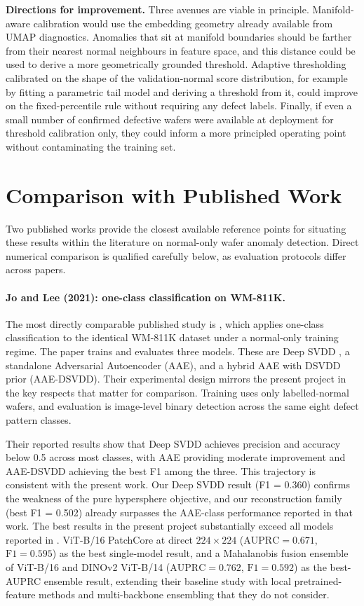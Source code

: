 \documentclass[11pt]{article}
\begin{document}
\textbf{Directions for improvement.} Three avenues are viable in principle. Manifold-aware calibration would use the embedding geometry already available from UMAP diagnostics. Anomalies that sit at manifold boundaries should be farther from their nearest normal neighbours in feature space, and this distance could be used to derive a more geometrically grounded threshold. Adaptive thresholding calibrated on the shape of the validation-normal score distribution, for example by fitting a parametric tail model and deriving a threshold from it, could improve on the fixed-percentile rule without requiring any defect labels. Finally, if even a small number of confirmed defective wafers were available at deployment for threshold calibration only, they could inform a more principled operating point without contaminating the training set.

\section{Comparison with Published Work}

Two published works provide the closest available reference points for
situating these results within the literature on normal-only wafer anomaly
detection. Direct numerical comparison is qualified carefully below, as
evaluation protocols differ across papers.

\paragraph{Jo and Lee (2021): one-class classification on WM-811K.}
The most directly comparable published study is \cite{jo2021oneclass},
which applies one-class classification to the identical WM-811K dataset
under a normal-only training regime. The paper trains and evaluates three
models. These are Deep SVDD \cite{ruff2018deepsvdd}, a standalone Adversarial
Autoencoder (AAE), and a hybrid AAE with DSVDD prior (AAE-DSVDD). Their
experimental design mirrors the present project in the key respects that
matter for comparison. Training uses only labelled-normal wafers, and
evaluation is image-level binary detection across the same eight defect
pattern classes.

Their reported results show that Deep SVDD achieves precision and accuracy
below 0.5 across most classes, with AAE providing moderate improvement and
AAE-DSVDD achieving the best F1 among the three. This trajectory is
consistent with the present work. Our Deep SVDD result (F1 = 0.360)
confirms the weakness of the pure hypersphere objective, and our
reconstruction family (best F1 = 0.502) already surpasses the AAE-class
performance reported in that work. The best results in the present project substantially exceed all models reported in
\cite{jo2021oneclass}. ViT-B/16 PatchCore at direct $224\!\times\!224$ ($\mathrm{AUPRC}=0.671$, $\mathrm{F1}=0.595$)
as the best single-model result, and a Mahalanobis fusion ensemble of ViT-B/16
and DINOv2 ViT-B/14 ($\mathrm{AUPRC}=0.762$, $\mathrm{F1}=0.592$) as the best-AUPRC ensemble result,
extending their baseline study with local pretrained-feature methods and multi-backbone ensembling that
they do not consider.
\end{document}
